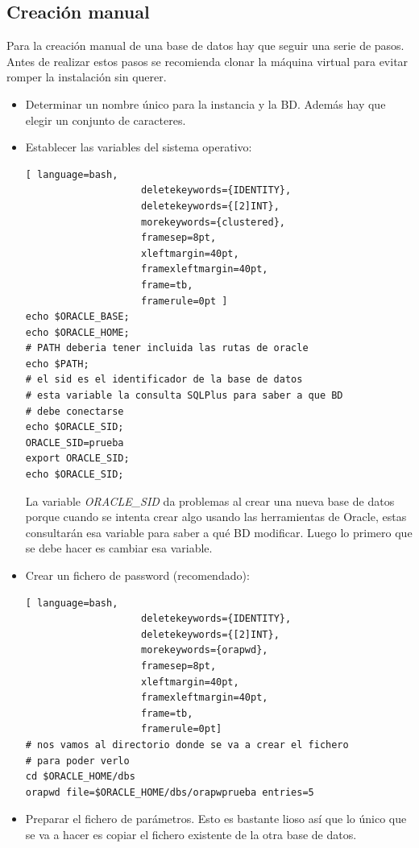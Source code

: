 \subsection{Creación manual}

Para la creación manual de una base de datos hay que seguir una serie de pasos. Antes de realizar estos pasos se recomienda clonar la máquina virtual para evitar romper la instalación sin querer.

\begin{itemize}
\item Determinar un nombre único para la instancia y la BD. Además hay que elegir un conjunto de caracteres.
\item Establecer las variables del sistema operativo:

\begin{lstlisting}[ language=bash,
                    deletekeywords={IDENTITY},
                    deletekeywords={[2]INT},
                    morekeywords={clustered},
                    framesep=8pt,
                    xleftmargin=40pt,
                    framexleftmargin=40pt,
                    frame=tb,
                    framerule=0pt ]
echo $ORACLE_BASE;
echo $ORACLE_HOME;
# PATH deberia tener incluida las rutas de oracle
echo $PATH;
# el sid es el identificador de la base de datos
# esta variable la consulta SQLPlus para saber a que BD 
# debe conectarse
echo $ORACLE_SID;
ORACLE_SID=prueba
export ORACLE_SID;
echo $ORACLE_SID;
\end{lstlisting}
La variable \textit{ORACLE\_SID} da problemas al crear una nueva base de datos porque cuando se intenta crear algo usando las herramientas de Oracle, estas consultarán esa variable para saber a qué BD modificar. Luego lo primero que se debe hacer es cambiar esa variable.
\item Crear un fichero de password (recomendado):
\begin{lstlisting}[ language=bash,
                    deletekeywords={IDENTITY},
                    deletekeywords={[2]INT},
                    morekeywords={orapwd},
                    framesep=8pt,
                    xleftmargin=40pt,
                    framexleftmargin=40pt,
                    frame=tb,
                    framerule=0pt]
# nos vamos al directorio donde se va a crear el fichero
# para poder verlo
cd $ORACLE_HOME/dbs
orapwd file=$ORACLE_HOME/dbs/orapwprueba entries=5
\end{lstlisting}
\item Preparar el fichero de parámetros. Esto es bastante lioso así que lo único que se va a hacer es copiar el fichero existente de la otra base de datos.

\end{itemize}
